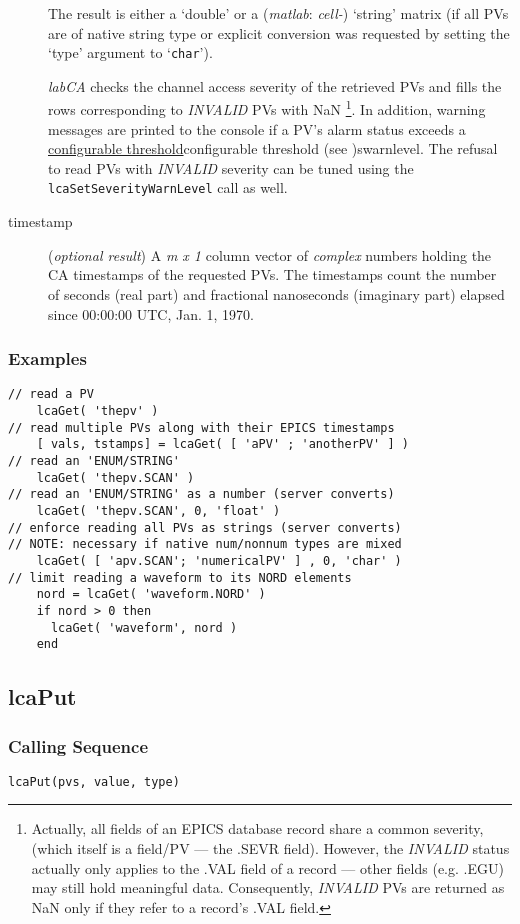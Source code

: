 \documentclass{article}
\newcommand{\sca}{\ita{labCA}}
\newcommand{\matlab}{\ita{matlab}}
\newcommand{\com}[1]{{\tt #1}}
\newcommand{\NAN}{\mbox{NaN}}
\newcommand{\pbrk}{\pagebreak[3]}
\newcommand{\ita}[1]{\emph{#1}}
\newcommand{\mxl}{$m\times 1$}
\renewcommand{\mxl}{\ita{m x 1}}
\renewcommand{\pbrk}{}
\begin{document}
\begin{description}
The result is either a `double' or a (\matlab: \ita{cell-}) `string'
matrix (if all PVs are of native string type or explicit conversion
was requested by setting the `type' argument to `\com{char}').

\sca{} checks the channel access severity of the retrieved PVs and
fills the rows corresponding to \ita{INVALID} PVs with \NAN%
\footnote{
Actually, all fields of an EPICS database record share a common
severity, (which itself is a field/PV --- the .SEVR field). However,
the \ita{INVALID} status actually only applies to the .VAL field
of a record --- other fields (e.g. .EGU) may still hold meaningful data.
Consequently, \ita{INVALID} PVs are returned as \NAN{} only if
they refer to a record's .VAL field.
}. In addition, warning
messages are printed to the console if a PV's alarm status exceeds
a \hyperref[ref]{configurable threshold}{configurable threshold (see }{ )}{swarnlevel}.
The refusal to read PVs with \ita{INVALID} severity can be tuned using
the \com{lcaSetSeverityWarnLevel} call as well.
%
%
\item[timestamp] (\ita{optional result}) A \mxl{}
column vector of \ita{complex} numbers holding the CA timestamps of
the requested PVs. The timestamps count the number of seconds (real part)
and fractional nanoseconds (imaginary part) elapsed since
00:00:00 UTC, Jan. 1, 1970.
\end{description}
\subsubsection{Examples}
\begin{verbatim}
// read a PV
    lcaGet( 'thepv' )
// read multiple PVs along with their EPICS timestamps
    [ vals, tstamps] = lcaGet( [ 'aPV' ; 'anotherPV' ] )
// read an 'ENUM/STRING'
    lcaGet( 'thepv.SCAN' )
// read an 'ENUM/STRING' as a number (server converts)
    lcaGet( 'thepv.SCAN', 0, 'float' )
// enforce reading all PVs as strings (server converts)
// NOTE: necessary if native num/nonnum types are mixed
    lcaGet( [ 'apv.SCAN'; 'numericalPV' ] , 0, 'char' )
// limit reading a waveform to its NORD elements
    nord = lcaGet( 'waveform.NORD' )
	if nord > 0 then
      lcaGet( 'waveform', nord )
	end
\end{verbatim}

\pbrk
\subsection{lcaPut}
\label{lcaput}
\subsubsection{Calling Sequence}
\begin{verbatim}
lcaPut(pvs, value, type)
\end{verbatim}
\end{document}
